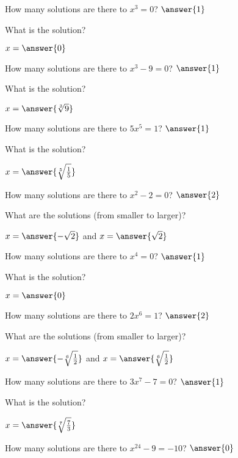 \documentclass{ximera}
\author{Kenneth Berglund}
\begin{document}
\begin{exercise}
How many solutions are there to $x^3=0$? $\answer{1}$
\begin{exercise}
What is the solution?

$x=\answer{0}$
\end{exercise}
\end{exercise}

\begin{exercise}
How many solutions are there to $x^3-9=0$? $\answer{1}$
\begin{exercise}
What is the solution?

$x=\answer{\sqrt[3]{9}}$
\end{exercise}
\end{exercise}

\begin{exercise}
How many solutions are there to $5x^5=1$? $\answer{1}$
\begin{exercise}
What is the solution?

$x=\answer{\sqrt[5]{\frac{1}{5}}}$
\end{exercise}
\end{exercise}

\begin{exercise}
How many solutions are there to $x^2 - 2=0$? $\answer{2}$
\begin{exercise}
What are the solutions (from smaller to larger)?

$x=\answer{-\sqrt{2}}$ and $x = \answer{\sqrt{2}}$
\end{exercise}
\end{exercise}

\begin{exercise}
How many solutions are there to $x^4=0$? $\answer{1}$
\begin{exercise}
What is the solution?

$x=\answer{0}$
\end{exercise}
\end{exercise}

\begin{exercise}
How many solutions are there to $2x^6=1$? $\answer{2}$
\begin{exercise}
What are the solutions (from smaller to larger)?

$x=\answer{-\sqrt[6]{\frac{1}{2}}}$ and $x=\answer{\sqrt[6]{\frac{1}{2}}}$
\end{exercise}
\end{exercise}

\begin{exercise}
How many solutions are there to $3x^7-7=0$? $\answer{1}$
\begin{exercise}
What is the solution?

$x=\answer{\sqrt[7]{\frac{7}{3}}}$
\end{exercise}
\end{exercise}

\begin{exercise}
How many solutions are there to $x^{24} -9=-10$? $\answer{0}$

\end{exercise}
\end{document}
